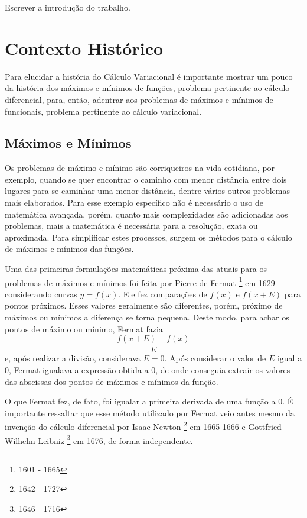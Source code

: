 \documentclass[
	12pt,				%
	openright,			%
    twoside,			%
	a4paper,			%
	english,			%
	french,				%
	spanish,			%
	brazil				%
	]{abntex2}
\numberwithin{lema}{chapter}
\numberwithin{teorema}{chapter}
\numberwithin{definicao}{chapter}
\numberwithin{exemplo}{chapter}
\numberwithin{figure}{chapter}
\newcommand{\bdDate}[2]{
	\footnote{\gtrsymBorn\text{ }#1 - \gtrsymDied\text{ }#2}
}
\begin{document}
{\color{red}Escrever a introdução do trabalho.}


\chapter{Contexto Histórico}

Para elucidar a história do Cálculo Variacional é importante mostrar um pouco da história dos máximos e mínimos de funções, problema pertinente ao cálculo diferencial, para, então, adentrar aos problemas de máximos e mínimos de funcionais, problema pertinente ao cálculo variacional.

\section{Máximos e Mínimos}

Os problemas de máximo e mínimo são corriqueiros na vida cotidiana, por exemplo, quando se quer encontrar o caminho com menor distância entre dois lugares para se caminhar uma menor distância, dentre vários outros problemas mais elaborados. Para esse exemplo específico não é necessário o uso de matemática avançada, porém, quanto mais complexidades são adicionadas aos problemas, mais a matemática é necessária para a resolução, exata ou aproximada. Para simplificar estes processos, surgem os métodos para o cálculo de máximos e mínimos das funções.

Uma das primeiras formulações matemáticas próxima das atuais para os problemas de máximos e mínimos foi feita por Pierre de Fermat\bdDate{1601}{1665} em 1629 considerando curvas $y=f(x)$. Ele fez comparações de $f(x)$ e $f(x+E)$ para pontos próximos. Esses valores geralmente são diferentes, porém, próximo de máximos ou mínimos a diferença se torna pequena. Deste modo, para achar os pontos de máximo ou mínimo, Fermat fazia
$$
	\frac{f(x+E)-f(x)}{E}
$$
e, após realizar a divisão, considerava $E=0$. Após considerar o valor de $E$ igual a $0$, Fermat igualava a expressão obtida a $0$, de onde conseguia extrair os valores das abscissas dos pontos de máximos e mínimos da função. \cite{boyer}

O que Fermat fez, de fato, foi igualar a primeira derivada de uma função a $0$. É importante ressaltar que esse método utilizado por Fermat veio antes mesmo da invenção do cálculo diferencial por Isaac Newton\bdDate{1642}{1727} em 1665-1666 e Gottfried Wilhelm Leibniz\bdDate{1646}{1716} em 1676, de forma independente. \cite{boyer}
\end{document}
